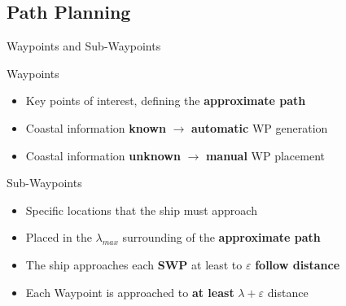 \subsection{Path Planning}
\begin{frame}{Waypoints and Sub-Waypoints}
    \begin{block}{Waypoints}
		\begin{itemize}
			\item Key points of interest, defining the \textbf{approximate path}
			\item Coastal information \textbf{known} $\rightarrow$ \textbf{automatic} WP generation
			\item Coastal information \textbf{unknown} $\rightarrow$ \textbf{manual} WP placement
		\end{itemize}
    \end{block}
    \begin{block}{Sub-Waypoints}
		\begin{itemize}
			\item Specific locations that the ship must approach
			\item Placed in the $\lambda_{max}$ surrounding of the \textbf{approximate path}
			\item The ship approaches each \textbf{SWP} at least to $\varepsilon$ \textbf{follow distance}
			\item Each Waypoint is approached to \textbf{at least} $\lambda + \varepsilon$ distance
		\end{itemize}
	\end{block}
\end{frame}

